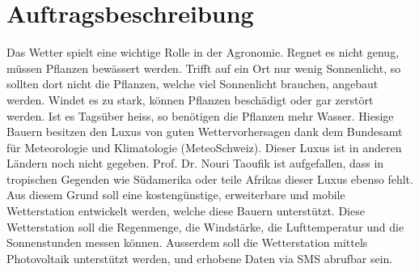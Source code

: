 \section{Auftragsbeschreibung}
Das Wetter spielt eine wichtige Rolle in der Agronomie. Regnet es nicht genug, müssen Pflanzen bewässert werden. Trifft auf ein Ort nur wenig Sonnenlicht, so sollten dort nicht die Pflanzen, welche viel Sonnenlicht brauchen, angebaut werden. Windet es zu stark, können Pflanzen beschädigt oder gar zerstört werden. Ist es Tagsüber heiss, so benötigen die Pflanzen mehr Wasser. Hiesige Bauern besitzen den Luxus von guten Wettervorhersagen dank dem Bundesamt für Meteorologie und Klimatologie (MeteoSchweiz). Dieser Luxus ist in anderen Ländern noch nicht gegeben. Prof. Dr. Nouri Taoufik ist aufgefallen, dass in tropischen Gegenden wie Südamerika oder teile Afrikas dieser Luxus ebenso fehlt. \\[0.5cm]
Aus diesem Grund soll eine kostengünstige, erweiterbare und mobile Wetterstation entwickelt werden, welche diese Bauern unterstützt. Diese Wetterstation soll die Regenmenge, die Windstärke, die Lufttemperatur und die Sonnenstunden messen können. Ausserdem soll die Wetterstation mittels Photovoltaik unterstützt werden, und erhobene Daten via SMS abrufbar sein. \\[0.5cm]
